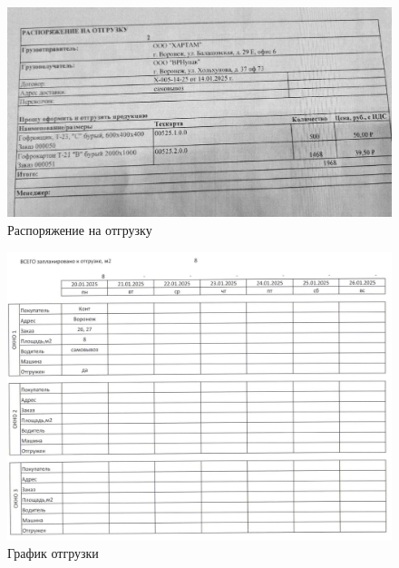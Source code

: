 \begin{figure}
\begin{center}
 \includegraphics[width=\linewidth, height=0.94\textheight, keepaspectratio]{Pics/f11.jpg}
\end{center}
\caption{Распоряжение на отгрузку}
\label{pic:f11}
\end{figure}

\begin{figure}
\begin{center}
 \includegraphics[width=\linewidth, height=0.94\textheight, keepaspectratio]{Pics/f14.jpg}
\end{center}
\caption{График отгрузки}
\label{pic:f14}
\end{figure}

